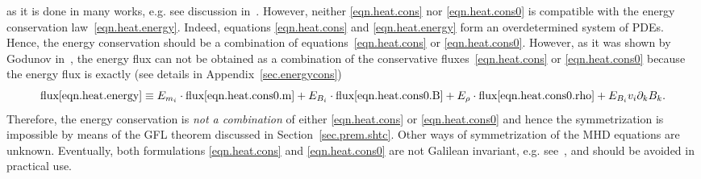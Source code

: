 \documentclass[twoside]{article}
\newcommand{\pd}{\partial}
\begin{document}
as it is done in many works, e.g. see discussion in~\cite{Powell1999}. However, 
neither \eqref{eqn.heat.cons} nor 
\eqref{eqn.heat.cons0} is compatible with the energy conservation 
law~\eqref{eqn.heat.energy}. Indeed, equations \eqref{eqn.heat.cons} and 
\eqref{eqn.heat.energy} form an overdetermined system of PDEs.  Hence, the 
energy conservation should be a combination of equations~\eqref{eqn.heat.cons} 
or \eqref{eqn.heat.cons0}. 
However, as it was shown by Godunov in~\cite{God1972}, the energy flux can not 
be obtained as a combination of the conservative fluxes~\eqref{eqn.heat.cons} 
or \eqref{eqn.heat.cons0} 
because the energy flux is exactly (see details in 
Appendix~\ref{sec.energycons})
\begin{equation}\label{eqn.heat.energyflux}
\text{flux}\eqref{eqn.heat.energy} \equiv 
E_{m_i}\cdot\text{flux}\eqref{eqn.heat.cons0.m} +
E_{B_i}\cdot\text{flux}\eqref{eqn.heat.cons0.B} +
E_{\rho}\cdot\text{flux}\eqref{eqn.heat.cons0.rho} + E_{B_i} v_i 
\pd_k B_k.
\end{equation}
Therefore, the energy conservation is \textit{not a combination} of either 
\eqref{eqn.heat.cons} or \eqref{eqn.heat.cons0} 
and hence the symmetrization is 
impossible by means of the GFL theorem discussed in 
Section~\ref{sec.prem.shtc}. Other ways of  
symmetrization of the MHD equations are unknown. 
Eventually, both formulations \eqref{eqn.heat.cons} 
and \eqref{eqn.heat.cons0} are not Galilean invariant, e.g. 
see~\cite{Powell1999}, and should be avoided in practical use.
\end{document}
